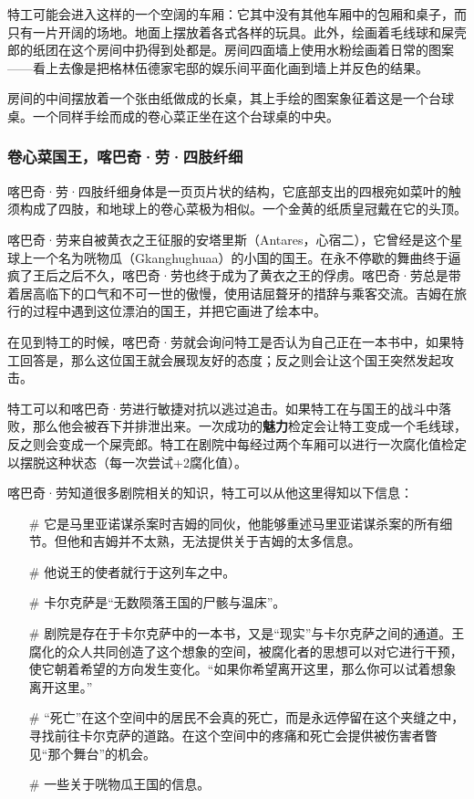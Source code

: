 特工可能会进入这样的一个空阔的车厢：它其中没有其他车厢中的包厢和桌子，而只有一片开阔的场地。地面上摆放着各式各样的玩具。此外，绘画着毛线球和屎壳郎的纸团在这个房间中扔得到处都是。房间四面墙上使用水粉绘画着日常的图案——看上去像是把格林伍德家宅邸的娱乐间平面化画到墙上并反色的结果。

房间的中间摆放着一个张由纸做成的长桌，其上手绘的图案象征着这是一个台球桌。一个同样手绘而成的卷心菜正坐在这个台球桌的中央。

\subsubsection{卷心菜国王，喀巴奇·劳·四肢纤细}

喀巴奇·劳·四肢纤细身体是一页页片状的结构，它底部支出的四根宛如菜叶的触须构成了四肢，和地球上的卷心菜极为相似。一个金黄的纸质皇冠戴在它的头顶。

喀巴奇·劳来自被黄衣之王征服的安塔里斯（Antares，心宿二），它曾经是这个星球上一个名为咣物瓜（Gkanghughuaa）的小国的国王。在永不停歇的舞曲终于逼疯了王后之后不久，喀巴奇·劳也终于成为了黄衣之王的俘虏。喀巴奇·劳总是带着居高临下的口气和不可一世的傲慢，使用诘屈聱牙的措辞与乘客交流。吉姆在旅行的过程中遇到这位漂泊的国王，并把它画进了绘本中。

在见到特工的时候，喀巴奇·劳就会询问特工是否认为自己正在一本书中，如果特工回答是，那么这位国王就会展现友好的态度；反之则会让这个国王突然发起攻击。

特工可以和喀巴奇·劳进行敏捷对抗以逃过追击。如果特工在与国王的战斗中落败，那么他会被吞下并排泄出来。一次成功的\textbf{魅力}检定会让特工变成一个毛线球，反之则会变成一个屎壳郎。特工在剧院中每经过两个车厢可以进行一次腐化值检定以摆脱这种状态（每一次尝试+2腐化值）。

喀巴奇·劳知道很多剧院相关的知识，特工可以从他这里得知以下信息：

\begin{itemize}
    \item[\#] 它是马里亚诺谋杀案时吉姆的同伙，他能够重述马里亚诺谋杀案的所有细节。但他和吉姆并不太熟，无法提供关于吉姆的太多信息。
    \item[\#] 他说王的使者就行于这列车之中。
    \item[\#] 卡尔克萨是“无数陨落王国的尸骸与温床”。
    \item[\#] 剧院是存在于卡尔克萨中的一本书，又是“现实”与卡尔克萨之间的通道。王腐化的众人共同创造了这个想象的空间，被腐化者的思想可以对它进行干预，使它朝着希望的方向发生变化。“如果你希望离开这里，那么你可以试着想象离开这里。”
    \item[\#] “死亡”在这个空间中的居民不会真的死亡，而是永远停留在这个夹缝之中，寻找前往卡尔克萨的道路。在这个空间中的疼痛和死亡会提供被伤害者瞥见“那个舞台”的机会。
    \item[\#] 一些关于咣物瓜王国的信息。
\end{itemize}

